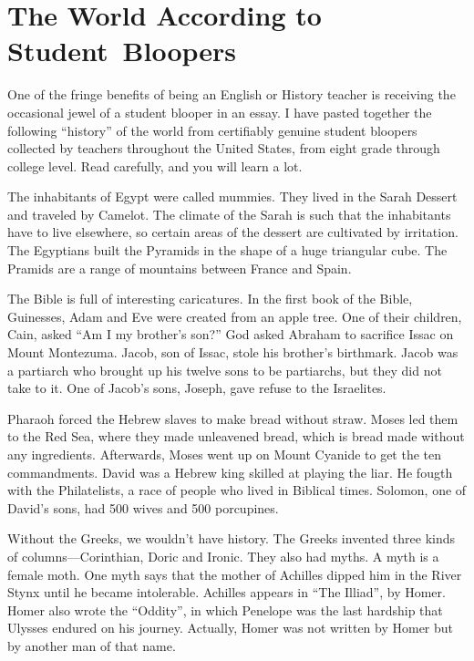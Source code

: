 
\chapter{The World According to Student~Bloopers}


One of the fringe benefits of being an English or History teacher is
receiving the occasional jewel of a student blooper in an essay. I
have pasted together the following ``history'' of the world from
certifiably genuine student bloopers collected by teachers throughout
the United States, from eight grade through college level. Read
carefully, and you will learn a lot.

The inhabitants of Egypt were called mummies. They lived in the Sarah
Dessert and traveled by Camelot. The climate of the Sarah is such that
the inhabitants have to live elsewhere, so certain areas of the
dessert are cultivated by irritation. The Egyptians built the
Pyramids in the shape of a huge triangular cube. The Pramids are a
range of mountains between France and Spain.

The Bible is full of interesting caricatures. In the first book of the
Bible, Guinesses, Adam and Eve were created from an apple tree. One of
their children, Cain, asked ``Am I my brother's son?'' God asked Abraham
to sacrifice Issac on Mount Montezuma. Jacob, son of Issac, stole his
brother's birthmark. Jacob was a partiarch who brought up his twelve
sons to be partiarchs, but they did not take to it. One of Jacob's
sons, Joseph, gave refuse to the Israelites.

Pharaoh forced the Hebrew slaves to make bread without straw. Moses
led them to the Red Sea, where they made unleavened bread, which is
bread made without any ingredients. Afterwards, Moses went up on Mount
Cyanide to get the ten commandments. David was a Hebrew king skilled
at playing the liar. He fougth with the Philatelists, a race of people
who lived in Biblical times. Solomon, one of David's sons, had 500
wives and 500 porcupines.

Without the Greeks, we wouldn't have history. The Greeks invented
three kinds of columns---Corinthian, Doric and Ironic. They also had
myths. A myth is a female moth. One myth says that the mother of
Achilles dipped him in the River Stynx until he became
intolerable. Achilles appears in ``The Illiad'', by Homer. Homer also
wrote the ``Oddity'', in which Penelope was the last hardship that
Ulysses endured on his journey. Actually, Homer was not written by
Homer but by another man of that name.

